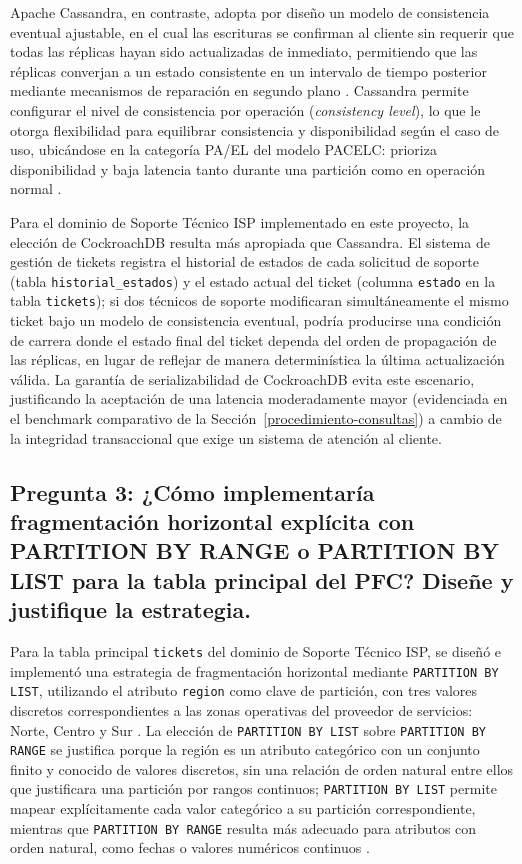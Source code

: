 \documentclass[12pt, a4paper]{article}
\begin{document}
Apache Cassandra, en contraste, adopta por diseño un modelo de consistencia eventual ajustable, en el cual las escrituras se confirman al cliente sin requerir que todas las réplicas hayan sido actualizadas de inmediato, permitiendo que las réplicas converjan a un estado consistente en un intervalo de tiempo posterior mediante mecanismos de reparación en segundo plano \cite{lakshman2010cassandra}. Cassandra permite configurar el nivel de consistencia por operación (\textit{consistency level}), lo que le otorga flexibilidad para equilibrar consistencia y disponibilidad según el caso de uso, ubicándose en la categoría PA/EL del modelo PACELC: prioriza disponibilidad y baja latencia tanto durante una partición como en operación normal \cite{lakshman2010cassandra}.

Para el dominio de Soporte Técnico ISP implementado en este proyecto, la elección de CockroachDB resulta más apropiada que Cassandra. El sistema de gestión de tickets registra el historial de estados de cada solicitud de soporte (tabla \texttt{historial\_estados}) y el estado actual del ticket (columna \texttt{estado} en la tabla \texttt{tickets}); si dos técnicos de soporte modificaran simultáneamente el mismo ticket bajo un modelo de consistencia eventual, podría producirse una condición de carrera donde el estado final del ticket dependa del orden de propagación de las réplicas, en lugar de reflejar de manera determinística la última actualización válida. La garantía de serializabilidad de CockroachDB evita este escenario, justificando la aceptación de una latencia moderadamente mayor (evidenciada en el benchmark comparativo de la Sección~\ref{procedimiento-consultas}) a cambio de la integridad transaccional que exige un sistema de atención al cliente.

\subsection*{Pregunta 3: ¿Cómo implementaría fragmentación horizontal explícita con PARTITION BY RANGE o PARTITION BY LIST para la tabla principal del PFC? Diseñe y justifique la estrategia.}

Para la tabla principal \texttt{tickets} del dominio de Soporte Técnico ISP, se diseñó e implementó una estrategia de fragmentación horizontal mediante \texttt{PARTITION BY LIST}, utilizando el atributo \texttt{region} como clave de partición, con tres valores discretos correspondientes a las zonas operativas del proveedor de servicios: Norte, Centro y Sur \cite{ozsu2020principles}. La elección de \texttt{PARTITION BY LIST} sobre \texttt{PARTITION BY RANGE} se justifica porque la región es un atributo categórico con un conjunto finito y conocido de valores discretos, sin una relación de orden natural entre ellos que justificara una partición por rangos continuos; \texttt{PARTITION BY LIST} permite mapear explícitamente cada valor categórico a su partición correspondiente, mientras que \texttt{PARTITION BY RANGE} resulta más adecuado para atributos con orden natural, como fechas o valores numéricos continuos \cite{ozsu2020principles}.
\end{document}
